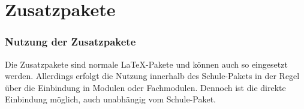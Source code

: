 \part{Zusatzpakete}
\label{sec:zusatzpakete}
\section{Nutzung der Zusatzpakete}
Die Zusatzpakete sind normale \LaTeX-Pakete und können auch so
eingesetzt werden. Allerdings erfolgt die Nutzung innerhalb des
Schule-Pakets in der Regel über die Einbindung in Modulen oder
Fachmodulen. Dennoch ist die direkte Einbindung möglich, auch
unabhängig vom Schule-Paket.




